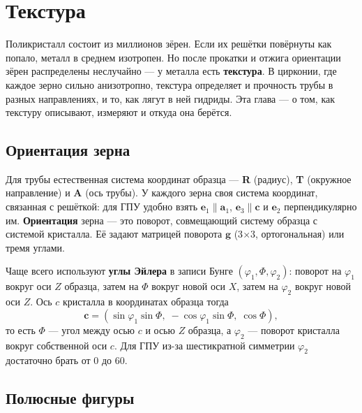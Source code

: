 \chapter{Текстура}\label{ch:texture}

Поликристалл состоит из миллионов зёрен. Если их решётки повёрнуты как попало, металл в среднем изотропен. Но
после прокатки и отжига ориентации зёрен распределены неслучайно --- у металла есть \textbf{текстура}. В цирконии,
где каждое зерно сильно анизотропно, текстура определяет и прочность трубы в разных направлениях, и то, как лягут
в ней гидриды. Эта глава --- о том, как текстуру описывают, измеряют и откуда она берётся.

\section{Ориентация зерна}

Для трубы естественная система координат образца --- \textbf{R} (радиус), \textbf{T} (окружное направление) и
\textbf{A} (ось трубы). У каждого зерна своя система координат, связанная с решёткой: для ГПУ удобно взять
$\mathbf e_1\parallel\mathbf a_1$, $\mathbf e_3\parallel\mathbf c$ и $\mathbf e_2$ перпендикулярно им. \textbf{Ориентация}
зерна --- это поворот, совмещающий систему образца с системой кристалла. Её задают матрицей поворота $\mathbf g$
(3$\times$3, ортогональная) или тремя углами.

Чаще всего используют \textbf{углы Эйлера} в записи Бунге $(\varphi_1, \Phi, \varphi_2)$: поворот на $\varphi_1$ вокруг оси
$Z$ образца, затем на $\Phi$ вокруг новой оси $X$, затем на $\varphi_2$ вокруг новой оси $Z$. Ось $c$ кристалла в
координатах образца тогда
\begin{equation}
\mathbf c = (\sin\varphi_1\sin\Phi,\; -\cos\varphi_1\sin\Phi,\; \cos\Phi),
\end{equation}
то есть $\Phi$ --- угол между осью $c$ и осью $Z$ образца, а $\varphi_2$ --- поворот кристалла вокруг собственной
оси $c$. Для ГПУ из-за шестикратной симметрии $\varphi_2$ достаточно брать от 0 до 60\textdegree.


\section{Полюсные фигуры}

